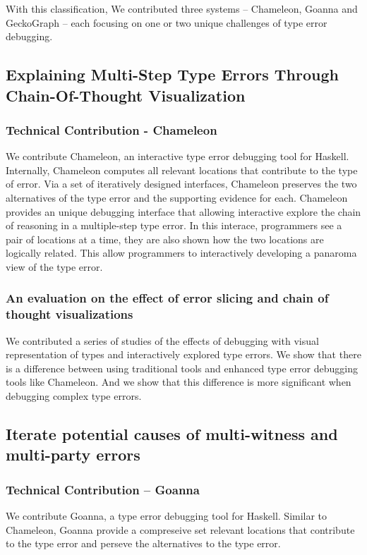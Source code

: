 With this classification, We contributed three systems -- Chameleon, Goanna and GeckoGraph -- each focusing on one or two unique challenges of type error debugging.

\subsection{Explaining Multi-Step Type Errors Through Chain-Of-Thought Visualization}

\subsubsection{Technical Contribution - Chameleon}
We contribute Chameleon, an interactive type error debugging tool for Haskell. Internally, Chameleon computes all relevant locations that contribute to the type of error. Via a set of iteratively designed interfaces, Chameleon preserves the two alternatives of the type error and the supporting evidence for each. Chameleon provides an unique debugging interface that allowing interactive explore the chain of reasoning in a multiple-step type error. In this interace, programmers see a pair of locations at a time, they are also shown how the two locations are logically related. This allow programmers to interactively developing a panaroma view of the type error. 

\subsubsection{An evaluation on the effect of error slicing and chain of thought visualizations}
We contributed a series of studies of the effects of debugging with visual representation of types and interactively explored type errors. We show that there is a difference between using traditional tools and enhanced type error debugging tools like Chameleon. And we show that this difference is more significant when debugging complex type errors.

\subsection{Iterate potential causes of multi-witness and multi-party errors}

\subsubsection{Technical Contribution -- Goanna}
We contribute Goanna, a type error debugging tool for Haskell. 
Similar to Chameleon, Goanna provide a compreseive set relevant locations that contribute to the type error and perseve the alternatives to the type error. 

